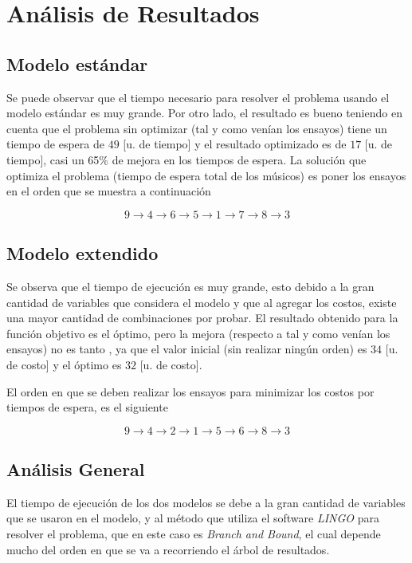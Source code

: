 \documentclass[journal, 10pt]{IEEEtran}
\begin{document}
\section{Análisis de Resultados}
\subsection{Modelo estándar}
Se puede observar que el tiempo necesario para resolver el problema usando el modelo estándar es muy grande. Por otro lado, el resultado es bueno teniendo en cuenta que el problema sin optimizar (tal y como venían los ensayos) tiene un tiempo de espera de $49$ [u. de tiempo] y el resultado optimizado es de $17$ [u. de tiempo], casi un 65\% de mejora en los tiempos de espera. La solución que optimiza el problema (tiempo de espera total de los músicos) es poner los ensayos en el orden que se muestra a continuación

$$ 9\rightarrow4\rightarrow6\rightarrow5\rightarrow1\rightarrow7\rightarrow8\rightarrow3 $$



\subsection{Modelo extendido}
Se observa que el tiempo de ejecución es muy grande, esto debido a la gran cantidad de variables que considera el modelo y que al agregar los costos, existe una mayor cantidad de combinaciones por probar. El resultado obtenido para la función objetivo es el óptimo, pero la mejora (respecto a tal y como venían los ensayos) no es tanto , ya que el valor inicial (sin realizar ningún orden) es $34$ [u. de costo] y el óptimo es $32$ [u. de costo].  

El orden en que se deben realizar los ensayos para minimizar los costos por tiempos de espera, es el siguiente

$$ 9\rightarrow4\rightarrow2\rightarrow1\rightarrow5\rightarrow6\rightarrow8\rightarrow3 $$

\subsection{Análisis General}
	El tiempo de ejecución de los dos modelos se debe a la gran cantidad de variables que se usaron en el modelo, y al método que utiliza el software \emph{LINGO} para resolver el problema, que en este caso es \emph{Branch and Bound}, el cual depende mucho del orden en que se va a recorriendo el árbol de resultados. 
	
\end{document}
